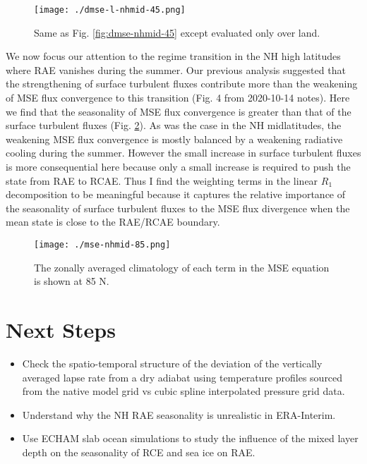 \documentclass[11pt]{article}
\begin{document}
\begin{figure}[htbp]
\centering
\texttt{[image: ./dmse-l-nhmid-45.png]}
\caption{\label{fig:dmse-l-nhmid-45}Same as Fig. \ref{fig:dmse-nhmid-45} except evaluated only over land.}
\end{figure}

We now focus our attention to the regime transition in the NH high latitudes where RAE vanishes during the summer. Our previous analysis suggested that the strengthening of surface turbulent fluxes contribute more than the weakening of MSE flux convergence to this transition (Fig. 4 from 2020-10-14 notes). Here we find that the seasonality of MSE flux convergence is greater than that of the surface turbulent fluxes (Fig. \ref{fig:mse-nhmid-85}). As was the case in the NH midlatitudes, the weakening MSE flux convergence is mostly balanced by a weakening radiative cooling during the summer. However the small increase in surface turbulent fluxes is more consequential here because only a small increase is required to push the state from RAE to RCAE. Thus I find the weighting terms in the linear \(R_1\) decomposition to be meaningful because it captures the relative importance of the seasonality of surface turbulent fluxes to the MSE flux divergence when the mean state is close to the RAE/RCAE boundary.

\begin{figure}[htbp]
\centering
\texttt{[image: ./mse-nhmid-85.png]}
\caption{\label{fig:mse-nhmid-85}The zonally averaged climatology of each term in the MSE equation is shown at 85 N.}
\end{figure}

\section{Next Steps}
\label{sec:orgd23aaa9}
\begin{itemize}
\item Check the spatio-temporal structure of the deviation of the vertically averaged lapse rate from a dry adiabat using temperature profiles sourced from the native model grid vs cubic spline interpolated pressure grid data.
\item Understand why the NH RAE seasonality is unrealistic in ERA-Interim.
\item Use ECHAM slab ocean simulations to study the influence of the mixed layer depth on the seasonality of RCE and sea ice on RAE.
\end{itemize}



\end{document}
